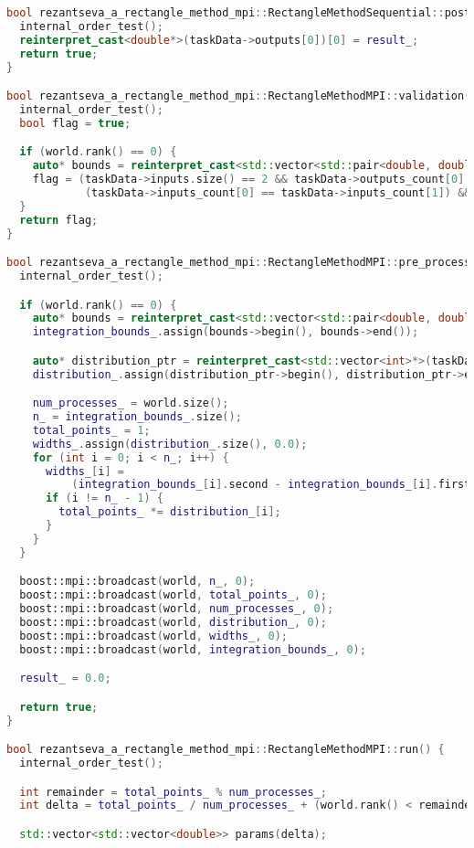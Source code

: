 \documentclass[12pt]{article}
\begin{document}
\begin{lstlisting}[language=C++]
bool rezantseva_a_rectangle_method_mpi::RectangleMethodSequential::post_processing() {
  internal_order_test();
  reinterpret_cast<double*>(taskData->outputs[0])[0] = result_;
  return true;
}

bool rezantseva_a_rectangle_method_mpi::RectangleMethodMPI::validation() {
  internal_order_test();
  bool flag = true;

  if (world.rank() == 0) {
    auto* bounds = reinterpret_cast<std::vector<std::pair<double, double>>*>(taskData->inputs[0]);
    flag = (taskData->inputs.size() == 2 && taskData->outputs_count[0] == 1 &&
            (taskData->inputs_count[0] == taskData->inputs_count[1]) && check_integration_bounds(bounds));
  }
  return flag;
}

bool rezantseva_a_rectangle_method_mpi::RectangleMethodMPI::pre_processing() {
  internal_order_test();

  if (world.rank() == 0) {
    auto* bounds = reinterpret_cast<std::vector<std::pair<double, double>>*>(taskData->inputs[0]);
    integration_bounds_.assign(bounds->begin(), bounds->end());

    auto* distribution_ptr = reinterpret_cast<std::vector<int>*>(taskData->inputs[1]);
    distribution_.assign(distribution_ptr->begin(), distribution_ptr->end());

    num_processes_ = world.size();
    n_ = integration_bounds_.size();
    total_points_ = 1;
    widths_.assign(distribution_.size(), 0.0);
    for (int i = 0; i < n_; i++) {
      widths_[i] =
          (integration_bounds_[i].second - integration_bounds_[i].first) / static_cast<double>(distribution_[i]);
      if (i != n_ - 1) {
        total_points_ *= distribution_[i];
      }
    }
  }

  boost::mpi::broadcast(world, n_, 0);
  boost::mpi::broadcast(world, total_points_, 0);
  boost::mpi::broadcast(world, num_processes_, 0);
  boost::mpi::broadcast(world, distribution_, 0);
  boost::mpi::broadcast(world, widths_, 0);
  boost::mpi::broadcast(world, integration_bounds_, 0);

  result_ = 0.0;

  return true;
}

bool rezantseva_a_rectangle_method_mpi::RectangleMethodMPI::run() {
  internal_order_test();

  int remainder = total_points_ % num_processes_;
  int delta = total_points_ / num_processes_ + (world.rank() < remainder ? 1 : 0);

  std::vector<std::vector<double>> params(delta);


\end{lstlisting}
\end{document}
